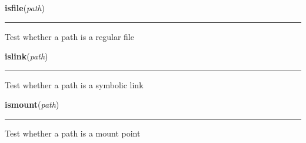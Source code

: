     \label{genericpath:isfile}

    \vspace{0.5ex}

\hspace{.8\funcindent}\begin{boxedminipage}{\funcwidth}

    \raggedright \textbf{isfile}(\textit{path})

    \vspace{-1.5ex}

    \rule{\textwidth}{0.5\fboxrule}
\setlength{\parskip}{2ex}
    Test whether a path is a regular file

\setlength{\parskip}{1ex}
    \end{boxedminipage}

    \label{posixpath:islink}

    \vspace{0.5ex}

\hspace{.8\funcindent}\begin{boxedminipage}{\funcwidth}

    \raggedright \textbf{islink}(\textit{path})

    \vspace{-1.5ex}

    \rule{\textwidth}{0.5\fboxrule}
\setlength{\parskip}{2ex}
    Test whether a path is a symbolic link

\setlength{\parskip}{1ex}
    \end{boxedminipage}

    \label{posixpath:ismount}

    \vspace{0.5ex}

\hspace{.8\funcindent}\begin{boxedminipage}{\funcwidth}

    \raggedright \textbf{ismount}(\textit{path})

    \vspace{-1.5ex}

    \rule{\textwidth}{0.5\fboxrule}
\setlength{\parskip}{2ex}
    Test whether a path is a mount point

\setlength{\parskip}{1ex}
    \end{boxedminipage}

    \label{posixpath:join}

